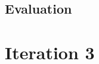 \documentclass[12pt,a4paper]{report}
\begin{document}
\subsection{Evaluation}




\section{Iteration 3\label{iteration3}}


{}

\end{document}

